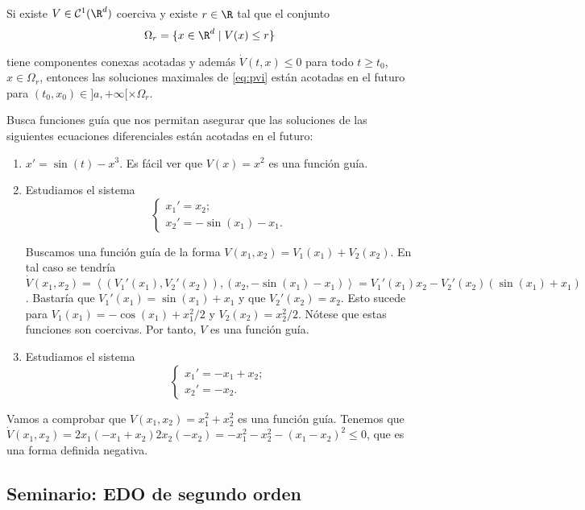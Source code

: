 \documentclass{article}
\begin{document}
\begin{theorem}
  \label{thm:guia:2}
  Si existe $V\in \mathcal{C}^1(\R^d)$ coerciva y existe $r \in \R$ tal que el conjunto
  \[ \Omega_r = \{x \in \R^d \mid V(x) \le r\} \]

  tiene componentes conexas acotadas y además $\dot{V}(t,x) \le 0$ para todo $t \ge
  t_0$,$x \in \Omega_r$, entonces las soluciones maximales de \eqref{eq:pvi} están acotadas en el
  futuro para $(t_0, x_0) \in ]a, +\infty[ \times \Omega_r$.
\end{theorem}


\begin{ex} 
  Busca funciones guía que nos permitan asegurar que las soluciones de las siguientes ecuaciones
  diferenciales están acotadas en el futuro:
  \begin{enumerate}
  \item $x' = \sin(t) - x^{3}$. Es fácil ver que $V(x) = x^2$ es una función guía.
  \item Estudiamos el sistema
    \[
      \begin{cases}
        x_1' = x_2; \\
        x_2' = -\sin(x_1)-x_1.
      \end{cases}
    \]

    Buscamos una función guía de la forma $V(x_1, x_2) = V_1(x_1) + V_2(x_2)$. En tal caso se
    tendría
    $\dot{V}(x_1, x_2) = \left\langle (V_1'(x_1), V_2'(x_2)), (x_2, -\sin(x_1) - x_1) \right\rangle
    = V_1'(x_1) x_2 - V_2'(x_2)(\sin(x_1) + x_1)$. Bastaría que $V_1'(x_1) = \sin(x_1) + x_1$ y que
    $V_2'(x_2) = x_2$. Esto sucede para $V_1(x_1) = - \cos(x_1) + x_1^2/ 2$ y
    $V_2(x_2) = x_2^2 / 2$. Nótese que estas funciones son coercivas. Por tanto, $V$ es una función
    guía.
  \item Estudiamos el sistema
    \[
      \begin{cases}
        x_1' = -x_1 + x_2; \\
        x_2' = -x_2.
      \end{cases}
    \]
  \end{enumerate}
  Vamos a comprobar que $V(x_1, x_2) = x_1^2 + x_2^2$ es una función guía. Tenemos que
  $\dot{V}(x_1, x_2) = 2x_1(-x_1+x_2) 2x_2(-x_2) = - x_1^2 - x_2^2 - (x_1-x_2)^2 \le 0$, que es una forma
  definida negativa.
\end{ex}


\subsection{Seminario: EDO de segundo orden}
\end{document}
